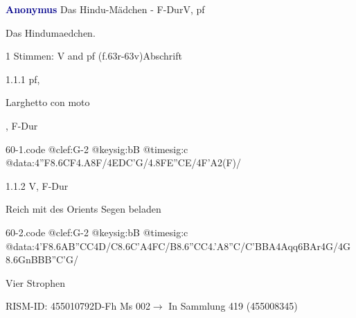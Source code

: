 \documentclass[twocolumn]{book}
\begin{document}
\par \vspace{7pt} \textcolor{darkblue}{\textbf{Anonymus  }}\hfillplus{\textbf{[60]}}\newline Das Hindu-Mädchen - F-Dur\newline V, pf
\par \begin{itshape}[heading, f.63r:] Das Hindumaedchen.\end{itshape} 
\par \textcolor{darkblue}{}  1 Stimmen: V and pf  (f.63r-63v)\newline Abschrift
\par 1.1.1  pf, \begin{itshape}Larghetto con moto\end{itshape}, F-Dur  
\begin{filecontents*}{60-1.code}
@clef:G-2
@keysig:bB
@timesig:c
@data:4''F{8.6CF}4.A8F/4EDC'G/4.8FE''CE/4F'A2(F)/
\end{filecontents*}
\newline
%
\par 1.1.2  V, F-Dur\newline \begin{footnotesize} Reich mit des Orients Segen beladen \end{footnotesize}  
\begin{filecontents*}{60-2.code}
@clef:G-2
@keysig:bB
@timesig:c
@data:4'F{8.6AB}{''CC}4D/C{8.6C'A}4FC/B{8.6''CC}4.'A8''C/C'BBA4Aqq6BAr4G/4G8.6GnB{BB}''C'G/
\end{filecontents*}
\newline
%
\par Vier Strophen
\par RISM-ID: 455010792\newline D-Fh  Ms 002\newline $\rightarrow$ In Sammlung 419 (455008345)
      
\end{document}
